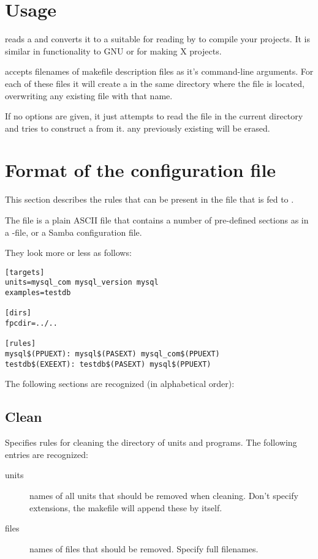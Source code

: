 \section{Usage}
 reads a  and converts it to a
 suitable for reading by \gnu {}
to compile your projects. It is similar in functionality to GNU
 or  for making X projects.

 accepts filenames of makefile description files
as it's command-line arguments. For each of these files it will
create a  in the same directory where the file is
located, overwriting any existing file with that name.

If no options are given, it just attempts to read the file
 in the current directory and tries to
construct a  from it. any previously existing
 will be erased.

\section{Format of the configuration file}
This section describes the rules that can be present in the file
that is fed to .

The file  is a plain ASCII file that contains
a number of pre-defined sections as in a \windows {}-file,
or a Samba configuration file.

They look more or less as follows:
\begin{verbatim}
[targets]
units=mysql_com mysql_version mysql
examples=testdb

[dirs]
fpcdir=../..

[rules]
mysql$(PPUEXT): mysql$(PASEXT) mysql_com$(PPUEXT)
testdb$(EXEEXT): testdb$(PASEXT) mysql$(PPUEXT)
\end{verbatim}

The following sections are recognized (in alphabetical order):

\subsection{Clean}
Specifies rules for cleaning the directory of units and programs.
The following entries are recognized:
\begin{description}
\item[units] names of all units that should be removed when cleaning.
Don't specify extensions, the makefile will append these by itself.
\item[files] names of files that should be removed. Specify full filenames.
\end{description}

